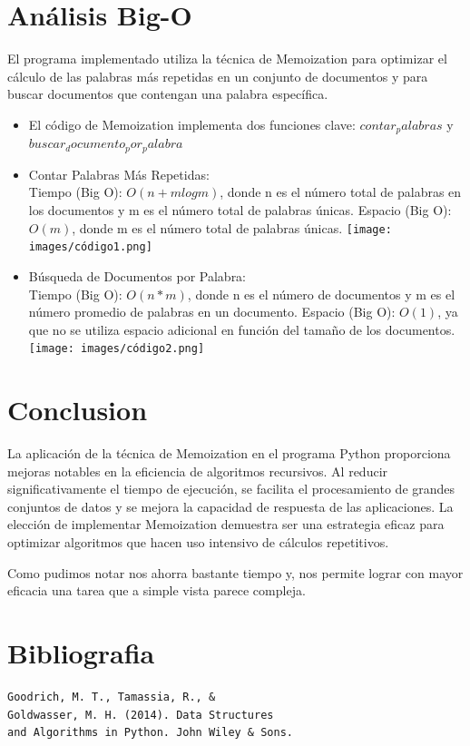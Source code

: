 \documentclass[a4paper,twocolumn,10pt]{article}
\begin{document}
\section{Análisis Big-O}

El programa implementado utiliza la técnica de Memoization para optimizar el cálculo de las palabras más repetidas en un conjunto de documentos y para buscar documentos que contengan una palabra específica.

\begin{itemize}
    \item El código de Memoization implementa dos funciones clave: $contar_palabras$ y $buscar_documento_por_palabra$

    \item Contar Palabras Más Repetidas:\\
    Tiempo (Big O): $O(n + m log m)$, donde n es el número total de palabras en los documentos y m es el número total de palabras únicas.
    Espacio (Big O): $O(m)$, donde m es el número total de palabras únicas.
    \texttt{[image: images/código1.png]}\\

    \item Búsqueda de Documentos por Palabra:\\
    Tiempo (Big O): $O(n * m)$, donde n es el número de documentos y m es el número promedio de palabras en un documento.
    Espacio (Big O): $O(1)$, ya que no se utiliza espacio adicional en función del tamaño de los documentos.
    \texttt{[image: images/código2.png]}\\
\end{itemize}


\section{Conclusion }

La aplicación de la técnica de Memoization en el programa Python proporciona mejoras notables en la eficiencia de algoritmos recursivos. Al reducir significativamente el tiempo de ejecución, se facilita el procesamiento de grandes conjuntos de datos y se mejora la capacidad de respuesta de las aplicaciones. La elección de implementar Memoization demuestra ser una estrategia eficaz para optimizar algoritmos que hacen uso intensivo de cálculos repetitivos.

Como pudimos notar nos ahorra bastante tiempo y, nos permite lograr con mayor eficacia una tarea que a simple vista parece compleja.

\section{Bibliografia}

\begin{verbatim}
Goodrich, M. T., Tamassia, R., &
Goldwasser, M. H. (2014). Data Structures 
and Algorithms in Python. John Wiley & Sons.    
\end{verbatim}
\end{document}
